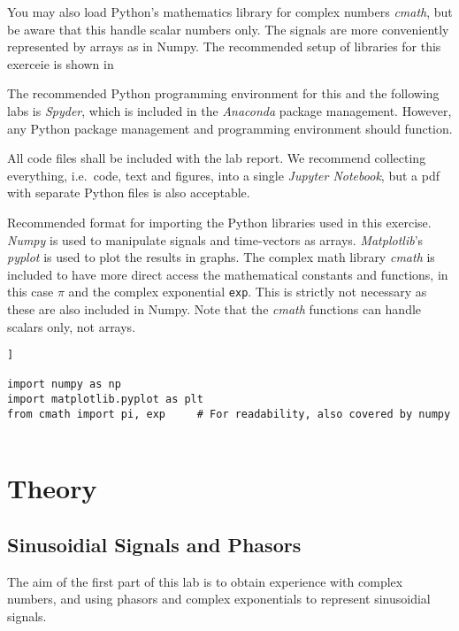 You may also load Python's mathematics library for complex numbers \emph{cmath}, but be aware that this handle scalar numbers only. The signals are more conveniently represented by arrays as in Numpy.
The recommended setup of libraries for this exerceie is shown in 

The recommended Python programming environment for this and the following labs is \emph{Spyder}\cite{raybaut_spyder_2024}, which is included in the \emph{Anaconda}\cite{noauthor_anaconda_2024} package management. However, any Python package management and programming environment should function.

All code files shall be included with the lab report. We recommend collecting everything, i.e.~code, text and figures, into a single \emph{Jupyter Notebook}\cite{project_jupyter_jupyter_nodate}, but a pdf with separate Python files is also acceptable.


\begin{table}[t!]
\caption{Recommended format for importing the Python libraries used in this exercise. \emph{Numpy} is used to manipulate signals and time-vectors as arrays. \emph{Matplotlib}'s \emph{pyplot} is used to plot the results in graphs.
	The complex math library \emph{cmath} is included to have more direct access the mathematical constants and functions, in this case $\pi$ and the complex exponential \texttt{exp}. This is strictly not necessary as these are also included in Numpy. Note that the \emph{cmath} functions can handle scalars only, not arrays. }
\label{tab:import-libraries}
\begin{lstlisting}[style=pythonstyle]]
		
import numpy as np
import matplotlib.pyplot as plt
from cmath import pi, exp     # For readability, also covered by numpy
		
\end{lstlisting}
\end{table}


\section{Theory}

\subsection{Sinusoidial Signals and Phasors}
The aim of the first part of this lab is to obtain experience with complex numbers, and using phasors and complex exponentials to represent sinusoidial signals.

